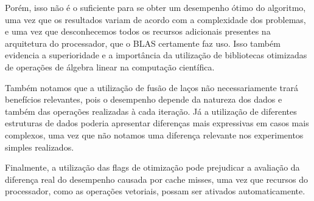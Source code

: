 \documentclass[conference]{IEEEtran}
\begin{document}
Porém, isso não é o suficiente para se obter um desempenho ótimo do algoritmo, uma vez que os resultados variam de acordo com a complexidade dos problemas, e uma vez que desconhecemos todos os recursos adicionais presentes na arquitetura do processador, que o BLAS certamente faz uso. Isso também evidencia a superioridade e a importância da utilização de bibliotecas otimizadas de operações de álgebra linear na computação científica.


Também notamos que a utilização de fusão de laços não necessariamente trará benefícios relevantes, pois o desempenho depende da natureza dos dados e também das operações realizadas à cada iteração. Já a utilização de diferentes estruturas de dados poderia apresentar diferenças mais expressivas em casos mais complexos, uma vez que não notamos uma diferença relevante nos experimentos simples realizados.

Finalmente, a utilização das flags de otimização pode prejudicar a avaliação da diferença real do desempenho causada por cache misses, uma vez que recursos do processador, como as operações vetoriais, possam ser ativados automaticamente.
\end{document}
